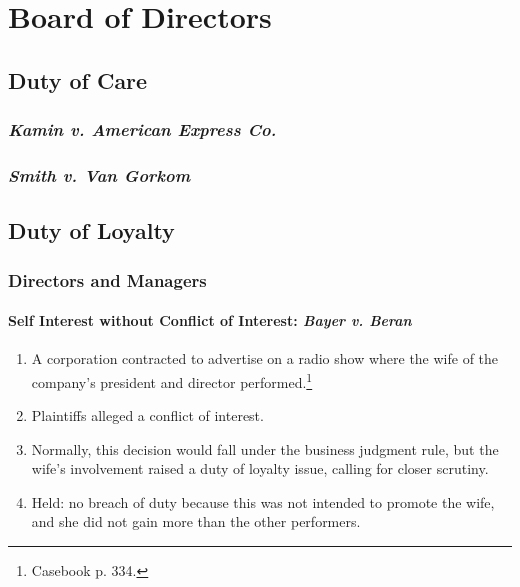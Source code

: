 \section{Board of Directors} %

\subsection{Duty of Care}

\subsubsection{\emph{Kamin v. American Express Co.}}


\subsubsection{\emph{Smith v. Van Gorkom}}


\subsection{Duty of Loyalty}

\subsubsection{Directors and Managers}

\paragraph{Self Interest without Conflict of Interest: \emph{Bayer v. Beran}}

\begin{enumerate}
    \item A corporation contracted to advertise on a radio show where the wife 
    of the company's president and director performed.\footnote{Casebook p. 
    334.}
    \item Plaintiffs alleged a conflict of interest.
    \item Normally, this decision would fall under the business judgment rule, 
    but the wife's involvement raised a duty of loyalty issue, calling for 
    closer scrutiny.
    \item Held: no breach of duty because this was not intended to promote the 
    wife, and she did not gain more than the other performers. 
\end{enumerate}

